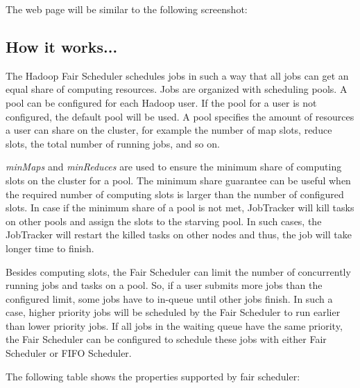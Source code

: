 The web page will be similar to the following screenshot:

\subsection*{How it works...}
The Hadoop Fair Scheduler schedules jobs in such a way that all jobs can get an equal share of computing resources. Jobs are organized with scheduling pools. A pool can be configured for each Hadoop user. If the pool for a user is not configured, the default pool will be used. A pool specifies the amount of resources a user can share on the cluster, for example the number of map slots, reduce slots, the total number of running jobs, and so on.

\emph{minMaps} and \emph{minReduces} are used to ensure the minimum share of computing slots on the cluster for a pool. The minimum share guarantee can be useful when the required number of computing slots is larger than the number of configured slots. In case if the minimum share of a pool is not met, JobTracker will kill tasks on other pools and assign the slots to the starving pool. In such cases, the JobTracker will restart the killed tasks on other nodes and thus, the job will take longer time to finish.

Besides computing slots, the Fair Scheduler can limit the number of concurrently running jobs and tasks on a pool. So, if a user submits more jobs than the configured limit, some jobs have to in-queue until other jobs finish. In such a case, higher priority jobs will be scheduled by the Fair Scheduler to run earlier than lower priority jobs. If all jobs in the waiting queue have the same priority, the Fair Scheduler can be configured to schedule these jobs with either Fair Scheduler or FIFO Scheduler.

The following table shows the properties supported by fair scheduler:

